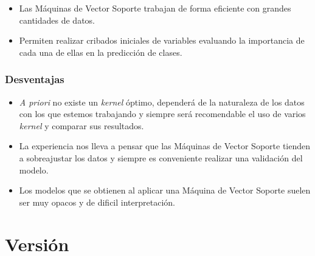 \documentclass[12pt,spanish,a4paper]{article}
\numberwithin{equation}{section}
\begin{document}
\begin{itemize}
\item
  Las Máquinas de Vector Soporte trabajan de forma eficiente con grandes
  cantidades de datos.
\item
  Permiten realizar cribados iniciales de variables evaluando la
  importancia de cada una de ellas en la predicción de clases.
\end{itemize}

\hypertarget{desventajas}{%
\subsubsection{Desventajas}\label{desventajas}}

\begin{itemize}
\item
  \emph{A priori} no existe un \emph{kernel} óptimo, dependerá de la
  naturaleza de los datos con los que estemos trabajando y siempre será
  recomendable el uso de varios \emph{kernel} y comparar sus resultados.
\item
  La experiencia nos lleva a pensar que las Máquinas de Vector Soporte
  tienden a sobreajustar los datos y siempre es conveniente realizar una
  validación del modelo.
\item
  Los modelos que se obtienen al aplicar una Máquina de Vector Soporte
  suelen ser muy opacos y de dificil interpretación.
\end{itemize}

\clearpage
\newpage

\hypertarget{version}{%
\section{Versión}\label{version}}
\end{document}
